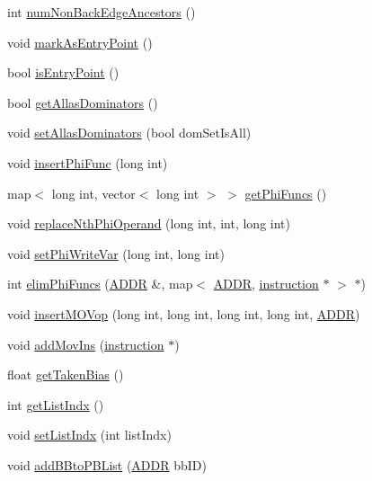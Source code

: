 \begin{DoxyCompactItemize}
\item 
int \hyperlink{classbasicblock_ad05a1a1f24dfb10d2c637065eaea2835}{numNonBackEdgeAncestors} ()
\item 
void \hyperlink{classbasicblock_a3da24f399435a4ba33a464925d4ded05}{markAsEntryPoint} ()
\item 
bool \hyperlink{classbasicblock_a81b824d2e109bb3b9484eb021fdd0a80}{isEntryPoint} ()
\item 
bool \hyperlink{classbasicblock_ad5a6467f9a1628c658671d2f432cbeba}{getAllasDominators} ()
\item 
void \hyperlink{classbasicblock_a11c8e9c8e6e38864552bafcd041e7a08}{setAllasDominators} (bool domSetIsAll)
\item 
void \hyperlink{classbasicblock_a933ceb18fc747c182520337b85c4f9da}{insertPhiFunc} (long int)
\item 
map$<$ long int, vector$<$ long int $>$ $>$ \hyperlink{classbasicblock_a3b5148a1563478d689e1e3796ebd7dba}{getPhiFuncs} ()
\item 
void \hyperlink{classbasicblock_ab9ce3574fe056958ce66401602c0c9a9}{replaceNthPhiOperand} (long int, int, long int)
\item 
void \hyperlink{classbasicblock_af5afec059922ab19cf93f9f84f5c85ed}{setPhiWriteVar} (long int, long int)
\item 
int \hyperlink{classbasicblock_a654646ba23c51a6f9b5b8db818276d0b}{elimPhiFuncs} (\hyperlink{binaryTranslator_2global_8h_a8bb6b77b3aab51e3a8d1866dd5861225}{ADDR} \&, map$<$ \hyperlink{binaryTranslator_2global_8h_a8bb6b77b3aab51e3a8d1866dd5861225}{ADDR}, \hyperlink{classinstruction}{instruction} $\ast$ $>$ $\ast$)
\item 
void \hyperlink{classbasicblock_ae2ba97a932c305fcad17c91871d9b53c}{insertMOVop} (long int, long int, long int, long int, \hyperlink{binaryTranslator_2global_8h_a8bb6b77b3aab51e3a8d1866dd5861225}{ADDR})
\item 
void \hyperlink{classbasicblock_ac4515bd617542ca0596df9864afd0aee}{addMovIns} (\hyperlink{classinstruction}{instruction} $\ast$)
\item 
float \hyperlink{classbasicblock_afdffc2f38dc3e93c9125a1e4d205f4e9}{getTakenBias} ()
\item 
int \hyperlink{classbasicblock_a17c48156a5eefea6d8ca831dced719e3}{getListIndx} ()
\item 
void \hyperlink{classbasicblock_a1d85d5fd059f1658ce3c67357502ed71}{setListIndx} (int listIndx)
\item 
void \hyperlink{classbasicblock_ab20f99e31cfc155ec00b9027f9c3d454}{addBBtoPBList} (\hyperlink{binaryTranslator_2global_8h_a8bb6b77b3aab51e3a8d1866dd5861225}{ADDR} bbID)

\end{DoxyCompactItemize}
